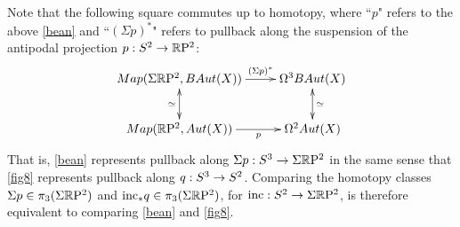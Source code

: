 \documentclass{amsart}
\begin{document}
Note that the following square commutes up to homotopy, where ``$p$" refers to the above \cref{bean} and ``$(\Sigma p)^\ast$" refers to pullback along the suspension of the antipodal projection $p: S^2 \rightarrow \mathbb R \mathrm{P}^2$:
\[
\xymatrix{
\Map(\Sigma\RP^2,B\Aut(X)) \ar[r]^-{(\Sigma p)^\ast} \ar@{<->}[d]_{\simeq} & \Omega^3 B\Aut(X)  \ar@{<->}[d]^{\simeq} \\
\Map(\RP^2,\Aut(X)) \ar[r]_-{p} & \Omega^2 \Aut(X)
}
\]
That is, \cref{bean} represents pullback along $\Sigma p: S^3 \rightarrow \Sigma \mathbb R \mathrm{P}^2$ in the same sense that \cref{fig8} represents pullback along $q: S^3 \rightarrow S^2$.  Comparing the homotopy classes $\Sigma p \in \pi_3(\Sigma \mathbb R \mathrm{P}^2)$ and $\mathrm{inc}_* q \in \pi_3(\Sigma \mathbb R \mathrm{P}^2)$, for $\mathrm{inc}: S^2 \rightarrow \Sigma \mathbb R \mathrm{P}^2$, is therefore equivalent to comparing \cref{bean} and \cref{fig8}.  
\end{document}
